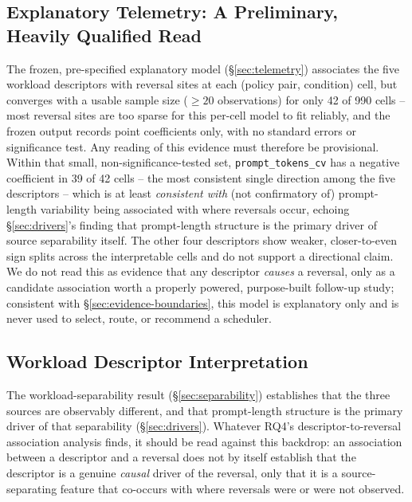 \documentclass[sn-basic,Numbered,pdflatex]{sn-jnl}
\begin{document}
\subsection{Explanatory Telemetry: A Preliminary, Heavily Qualified Read}
\label{sec:telemetry-explanation}

The frozen, pre-specified explanatory model (\S\ref{sec:telemetry})
associates the five workload
descriptors with reversal sites at each (policy pair, condition) cell, but
converges with a usable sample size ($\geq 20$ observations) for only 42 of
990 cells -- most reversal sites are too sparse for this per-cell model to
fit reliably, and the frozen output records point coefficients only, with
no standard errors or significance test. Any reading of this evidence must
therefore be provisional. Within that small, non-significance-tested set,
\texttt{prompt\_tokens\_cv} has a negative coefficient in 39 of 42 cells --
the most consistent single direction among the five descriptors -- which
is at least \emph{consistent with} (not confirmatory of) prompt-length
variability being associated with where reversals occur, echoing
\S\ref{sec:drivers}'s finding that prompt-length structure is the primary
driver of source separability itself. The other four descriptors show
weaker, closer-to-even sign splits across the interpretable cells and do
not support a directional claim. We do not read this as evidence that any
descriptor \emph{causes} a reversal, only as a candidate association worth
a properly powered, purpose-built follow-up study; consistent with
\S\ref{sec:evidence-boundaries}, this model is explanatory only and is
never used to select, route, or recommend a scheduler.

\subsection{Workload Descriptor Interpretation}

The workload-separability result (\S\ref{sec:separability}) establishes
that the three sources are observably different, and that prompt-length
structure is the primary driver of that separability
(\S\ref{sec:drivers}). Whatever RQ4's descriptor-to-reversal association
analysis finds, it should be read against this backdrop: an association
between a descriptor and a reversal does not by itself establish that the
descriptor is a genuine \emph{causal} driver of the reversal, only that it
is a source-separating feature that co-occurs with where reversals were or
were not observed.
\end{document}
